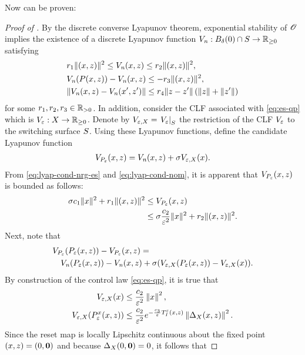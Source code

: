 \documentclass[twocolumn]{article}
\begin{document}
Now  can be proven:
\begin{proof} [Proof of ]
  By the discrete converse Lyapunov theorem, exponential stability of $\Orbit$ implies the existence of a discrete Lyapunov function $\Vn : B_{\delta}(0) \cap \S \to \Rnn$ satisfying
  \begin{eqnarray}
    \label{eq:lyap-cond-nom}
    &r_{1} \| \argsxz \|^{2} \leq \Vn\argsxz \leq r_{2} \| \argsxz \|^2,\\
    \nonumber
    &\Vn(\P\argsxz) - \Vn\argsxz \leq -r_{3} \| \argsxz \|^{2},\\
    \nonumber
    &\| \Vn\argsxz - \Vn(\zdx', \zdz') \| \leq r_{4} \| \zdz - \zdz' \| \left( \|\zdz\| + \|\zdz'\|\right)
  \end{eqnarray}
  for some $r_{1}, r_{2}, r_{3} \in \Rpd$.
  In addition, consider the CLF associated with \eqref{eq:es-qp} which is $\Ve : \zdX \to \Rnn$.
  Denote by $\Vex = \VeS$ the restriction of the CLF $\Ve$ to the switching surface $\S$.
  Using these Lyapunov functions, define the candidate Lyapunov function
  \begin{align}
    \VP\argsxz = \Vn\argsxz + \sigma \Vex(\zdx).
  \end{align}
  From \eqref{eq:lyap-cond-nrg-es} and \eqref{eq:lyap-cond-nom}, it is apparent that $\VP\argsxz$ is bounded as follows:
  \begin{align}
    \sigma c_{1} \| \zdx \|^{2} + r_{1} \| \argsxz \|^{2} &\leq \VP\argsxz\\
    \nonumber
    &\leq \sigma \frac{c_{2}}{\resclfparam^{2}} \| \zdx \|^{2} + r_{2} \| \argsxz \|^{2}.
  \end{align}
  Next, note that
  \begin{align}
    \lefteqn{\VP(\Pe\argsxz) - \VP\argsxz =}\\
    \nonumber
      &&\Vn(\Pe\argsxz) - \Vn\argsxz + \sigma(\Vex(\Pe\argsxz) - \Vex(\zdx)).
  \end{align}
  By construction of the control law \eqref{eq:es-qp}, it is true that
  \begin{align}
    \label{eq:Veh-bound}
    \Vex(\zdx) &\leq \frac{c_{2}}{\resclfparam^{2}} \left\| \zdx \right\|^{2},\\
    \nonumber
    \Vex(\Pe^{\zdx}\argsxz) &\leq \frac{c_{2}}{\resclfparam^{2}} e^{-\frac{c_{3}}{\resclfparam} \TIe\argsxz} \left\| \DeltaX\argsxz \right\|^{2}.
  \end{align}
  Since the reset map is locally Lipschitz continuous about the fixed point $\argsxz = (0, \boldzero)$ and because $\DeltaX(0, \boldzero) = 0$, it follows that

\end{proof}
\end{document}
